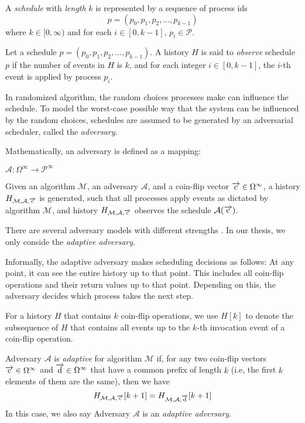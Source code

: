 A \emph{schedule} with \emph{length} $k$ is represented by a sequence of process ids
$$p = (p_0, p_1, p_2,..., p_{k-1})$$ where $k \in [0, \infty)$ and for each $i \in [0, k-1]$,
$p_i \in \mathcal{P}$.

Let a schedule $p = (p_0, p_1, p_2,..., p_{k-1})$.
A history $H$ is said to \emph{observe} schedule $p$ if the number of events in $H$ is $k$,
and for each integer $i \in [0, k-1]$, the $i$-th event is applied by process $p_i$.

In randomized algorithm, the random choices processes make can influence the schedule.
To model the worst-case possible way that the system can be influenced by the random choices,
schedules are assumed to be generated by an adversarial scheduler, called the \emph{adversary}.

Mathematically, an adversary is defined as a mapping:
\begin{center}
$\mathcal{A} :  \Omega^{\infty} \to \mathcal{P}^{\infty}$
\end{center}

Given an algorithm $\mathcal{M}$, an adversary $\mathcal{A}$, and
a coin-flip vector $\overrightarrow{\rm c} \in \Omega^{\infty}$,
a history $H_{\mathcal{M},\mathcal{A}, \overrightarrow{\rm c}}$ is generated, such that all
processes apply events as dictated by algorithm $\mathcal{M}$, and history
$H_{\mathcal{M}, \mathcal{A}, \overrightarrow{\rm c}}$
observes the schedule $\mathcal{A(\overrightarrow{\rm c})}$.

There are several adversary models with different strengths \cite{DBLP:journals/corr/cs-DS-0209014}.
In our thesis, we only conside the \emph{adaptive adversary}.

Informally, the adaptive adversary makes scheduling
decisions as follows: At any point, it can see the entire history up to that point.
This includes all coin-flip operations and their return values up to that point. Depending on this,
the adversary decides which process takes the next step.

For a history $H$ that contains $k$ coin-flip operations, we use $H[k]$ to denote the subsequence of
$H$ that contains all events up to the $k$-th invocation event of a coin-flip operation.

Adversary $\mathcal{A}$ is \emph{adaptive} for algorithm $\mathcal{M}$ if, for any two coin-flip
vectors $\overrightarrow{\rm c} \in \Omega^{\infty}$ and $\overrightarrow{\rm d} \in \Omega^{\infty}$ that have a common prefix
of length $k$ (i.e, the first $k$ elements of them are the same), then we have
$$H_{\mathcal{M},\mathcal{A}, \overrightarrow{\rm c}}[k+1] = H_{\mathcal{M},\mathcal{A}, \overrightarrow{\rm d}}[k+1]$$
In this case, we also say Adversary $\mathcal{A}$ is an \emph{adaptive adversary}.

